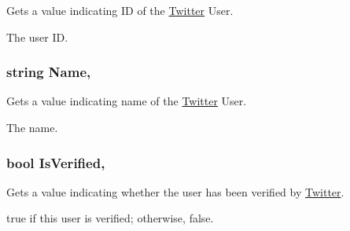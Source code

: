 Gets a value indicating I\+D of the \hyperlink{class_voxel_busters_1_1_native_plugins_1_1_twitter}{Twitter} User. 

The user I\+D.\hypertarget{class_voxel_busters_1_1_native_plugins_1_1_twitter_user_a7ee9065718e6628dc7791b756fa6c0f9}{}
\subsubsection[{Name}]{\setlength{\rightskip}{0pt plus 5cm}string Name\hspace{0.3cm}{\ttfamily [get]}, {}}\label{class_voxel_busters_1_1_native_plugins_1_1_twitter_user_a7ee9065718e6628dc7791b756fa6c0f9}


Gets a value indicating name of the \hyperlink{class_voxel_busters_1_1_native_plugins_1_1_twitter}{Twitter} User. 

The name.\hypertarget{class_voxel_busters_1_1_native_plugins_1_1_twitter_user_a56786d050e742ceab749ee116da69c24}{}
\subsubsection[{Is\+Verified}]{\setlength{\rightskip}{0pt plus 5cm}bool Is\+Verified\hspace{0.3cm}{\ttfamily [get]}, {}}\label{class_voxel_busters_1_1_native_plugins_1_1_twitter_user_a56786d050e742ceab749ee116da69c24}


Gets a value indicating whether the user has been verified by \hyperlink{class_voxel_busters_1_1_native_plugins_1_1_twitter}{Twitter}. 

{\ttfamily true} if this user is verified; otherwise, {\ttfamily false}.\hypertarget{class_voxel_busters_1_1_native_plugins_1_1_twitter_user_a230cd87f736815fe5dfe96ba6adf3b5e}{}
